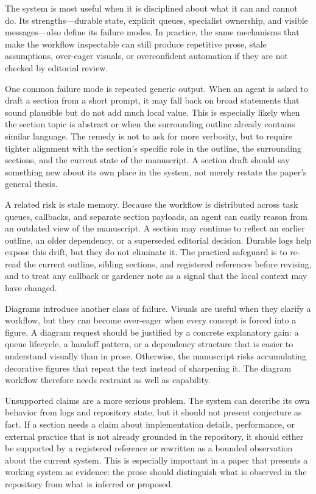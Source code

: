 The system is most useful when it is disciplined about what it can and cannot do. Its strengths---durable state, explicit queues, specialist ownership, and visible messages---also define its failure modes. In practice, the same mechanisms that make the workflow inspectable can still produce repetitive prose, stale assumptions, over-eager visuals, or overconfident automation if they are not checked by editorial review.

One common failure mode is repeated generic output. When an agent is asked to draft a section from a short prompt, it may fall back on broad statements that sound plausible but do not add much local value. This is especially likely when the section topic is abstract or when the surrounding outline already contains similar language. The remedy is not to ask for more verbosity, but to require tighter alignment with the section's specific role in the outline, the surrounding sections, and the current state of the manuscript. A section draft should say something new about its own place in the system, not merely restate the paper's general thesis.

A related risk is stale memory. Because the workflow is distributed across task queues, callbacks, and separate section payloads, an agent can easily reason from an outdated view of the manuscript. A section may continue to reflect an earlier outline, an older dependency, or a superseded editorial decision. Durable logs help expose this drift, but they do not eliminate it. The practical safeguard is to re-read the current outline, sibling sections, and registered references before revising, and to treat any callback or gardener note as a signal that the local context may have changed.

Diagrams introduce another class of failure. Visuals are useful when they clarify a workflow, but they can become over-eager when every concept is forced into a figure. A diagram request should be justified by a concrete explanatory gain: a queue lifecycle, a handoff pattern, or a dependency structure that is easier to understand visually than in prose. Otherwise, the manuscript risks accumulating decorative figures that repeat the text instead of sharpening it. The diagram workflow therefore needs restraint as well as capability.

Unsupported claims are a more serious problem. The system can describe its own behavior from logs and repository state, but it should not present conjecture as fact. If a section needs a claim about implementation details, performance, or external practice that is not already grounded in the repository, it should either be supported by a registered reference or rewritten as a bounded observation about the current system. This is especially important in a paper that presents a working system as evidence: the prose should distinguish what is observed in the repository from what is inferred or proposed.

